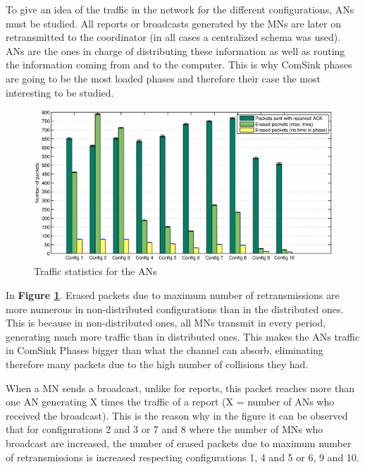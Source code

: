To give an idea of the traffic in the network for the different configurations, \acp{AN} must be studied. All reports or broadcasts generated by the
\acp{MN} are later on retransmitted to the coordinator (in all cases a centralized schema was used). \acp{AN} are the ones in charge of distributing these
information as well as routing the information coming from and to the computer. This is why ComSink phases are going to be the most loaded
phases and therefore their case the most interesting to be studied.

\begin{figure}[ht]
 \begin{center}
  \includegraphics[width=1\textwidth]{packetsSentErasedNoTimeAN.eps}
 \end{center}
 \caption{Traffic statistics for the \acp{AN}}
 \label{fig:packetsSentErasedNoTimeAN}
\end{figure}

In \textbf{Figure \ref{fig:packetsSentErasedNoTimeAN}}. Erased packets due to maximum number of retransmissions are more numerous in non-distributed 
configurations than in the distributed ones. This is because in non-distributed ones, all \acp{MN} transmit in every period, generating much more traffic
than in distributed ones. This makes the \acp{AN} traffic in ComSink Phases bigger than what the channel can absorb, eliminating therefore many packets 
due to the high number of collisions they had.

When a \ac{MN} sends a broadcast, unlike for reports, this packet reaches more than one \ac{AN} generating X times the traffic of a report (X = number of \acp{AN}
who received the broadcast). This is the reason why in the figure it can be observed that for configurations 2 and 3 or 7 and 8 where the number of 
\acp{MN} who broadcast are increased, the number of erased packets due to maximum number of retransmissions is increased respecting configurations
1, 4 and 5 or 6, 9 and 10.

